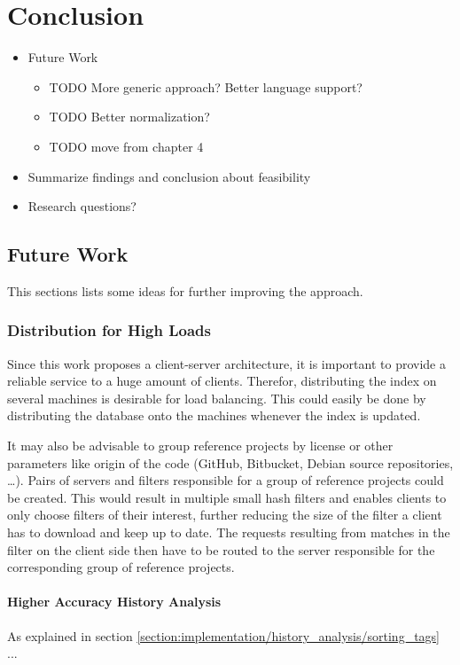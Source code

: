 
\chapter{Conclusion}\label{chapter:conclusion}
\begin{itemize}
	\item Future Work
	\begin{itemize}
	    \item TODO More generic approach? Better language support?
	    \item TODO Better normalization?
	    \item TODO move from chapter 4
	\end{itemize}
	\item Summarize findings and conclusion about feasibility
	\item Research questions?
\end{itemize}

\section{Future Work}
This sections lists some ideas for further improving the approach.

\subsection{Distribution for High Loads}
Since this work proposes a client-server architecture, it is important to provide a reliable service to a huge amount of clients.
Therefor, distributing the index on several machines is desirable for load balancing.
This could easily be done by distributing the database onto the machines whenever the index is updated.

It may also be advisable to group reference projects by license or other parameters like origin of the code (GitHub, Bitbucket, Debian source repositories, \dots).
Pairs of servers and filters responsible for a group of reference projects could be created.
This would result in multiple small hash filters and enables clients to only choose filters of their interest, further reducing the size of the filter a client has to download and keep up to date.
The requests resulting from matches in the filter on the client side then have to be routed to the server responsible for the corresponding group of reference projects.

\subsubsection{Higher Accuracy History Analysis}
As explained in section \ref{section:implementation/history_analysis/sorting_tags} ...


